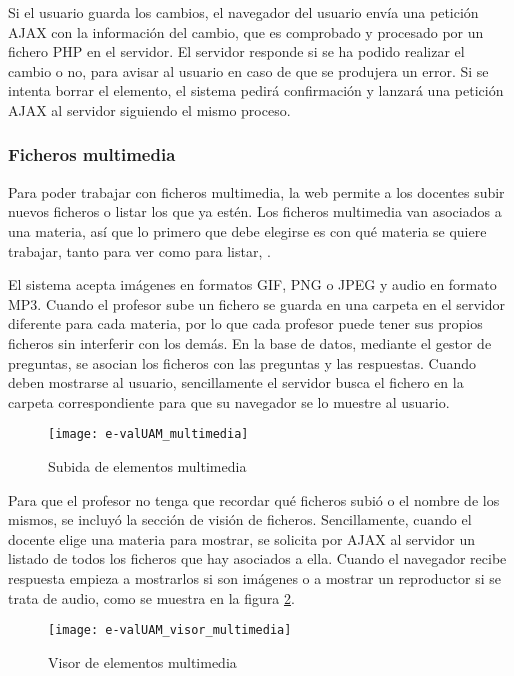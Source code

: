 Si el usuario guarda los cambios, el navegador del usuario envía una petición AJAX con la información del cambio, que es comprobado y procesado por un fichero PHP en el servidor. El servidor responde si se ha podido realizar el cambio o no, para avisar al usuario en caso de que se produjera un error. Si se intenta borrar el elemento, el sistema pedirá confirmación y lanzará una petición AJAX al servidor siguiendo el mismo proceso.

\subsubsection{Ficheros multimedia}

Para poder trabajar con ficheros multimedia, la web permite a los docentes subir nuevos ficheros o listar los que ya estén. Los ficheros multimedia van asociados a una materia, así que lo primero que debe elegirse es con qué materia se quiere trabajar, tanto para ver como para listar, .

El sistema acepta imágenes en formatos GIF, PNG o JPEG y audio en formato MP3. Cuando el profesor sube un fichero se guarda en una carpeta en el servidor diferente para cada materia, por lo que cada profesor puede tener sus propios ficheros sin interferir con los demás. En la base de datos, mediante el gestor de preguntas, se asocian los ficheros con las preguntas y las respuestas. Cuando deben mostrarse al usuario, sencillamente el servidor busca el fichero en la carpeta correspondiente para que su navegador se lo muestre al usuario.

\begin{figure}[htp!]
	\centering
	\texttt{[image: e-valUAM\_multimedia]}
	\caption{Subida de elementos multimedia}
	\label{fig:e-valUAM multimedia profesor}
\end{figure}

Para que el profesor no tenga que recordar qué ficheros subió o el nombre de los mismos, se incluyó la sección de visión de ficheros. Sencillamente, cuando el docente elige una materia para mostrar, se solicita por AJAX al servidor un listado de todos los ficheros que hay asociados a ella. Cuando el navegador recibe respuesta empieza a mostrarlos si son imágenes o a mostrar un reproductor si se trata de audio, como se muestra en la figura \ref{fig:e-valUAM visor multimedia profesor}.

\begin{figure}[htp!]
	\centering
	\texttt{[image: e-valUAM\_visor\_multimedia]}
	\caption{Visor de elementos multimedia}
	\label{fig:e-valUAM visor multimedia profesor}
\end{figure}

